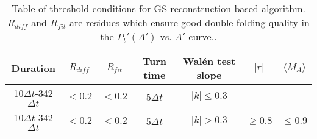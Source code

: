 \begin{table}[h!]
\centering
\caption[Threshold conditions for GS algorithm]{Table of threshold conditions for GS reconstruction-based algorithm. $R_{diff}$ and $R_{fit}$ are residues which ensure good double-folding quality in the $P_t'(A')$ vs. $A'$ curve..} %
\begin{tabular}{ccccccc}
\toprule
    Duration  & $R_{diff}$ & $R_{fit}$ & Turn time & Wal\'en test slope & $|r|$ & $\langle M_A\rangle$ \\ 
    \hline
    10$\Delta t$-342$\Delta t$ & $<0.2$ & $<0.2$ & 5$\Delta t$ & $|k|\leq 0.3$ & & \\
    10$\Delta t$-342$\Delta t$ & $<0.2$ & $<0.2$ & 5$\Delta t$ & $|k|> 0.3$ & $\geq 0.8$ & $\leq 0.9$ \\
\bottomrule %
\end{tabular}
\label{tab:thresholds}
\end{table}


